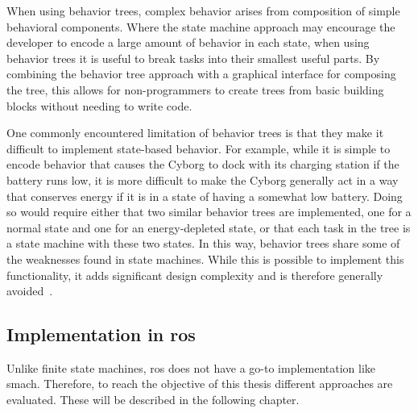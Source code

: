 \documentclass[\rootfolder/main.tex]{subfiles}
\begin{document}
When using behavior trees, complex behavior arises from composition of simple behavioral components.
Where the state machine approach may encourage the developer to encode a large amount of behavior in each state, when using behavior trees it is useful to break tasks into their smallest useful parts.
By combining the behavior tree approach with a graphical interface for composing the tree, this allows for non-programmers to create trees from basic building blocks without needing to write code.

One commonly encountered limitation of behavior trees is that they make it difficult to implement state-based behavior.
For example, while it is simple to encode behavior that causes the Cyborg to dock with its charging station if the battery runs low, it is more difficult to make the Cyborg generally act in a way that conserves energy if it is in a state of having a somewhat low battery.
Doing so would require either that two similar behavior trees are implemented, one for a normal state and one for an energy-depleted state, or that each task in the tree is a state machine with these two states.
In this way, behavior trees share some of the weaknesses found in state machines.
While this is possible to implement this functionality, it adds significant design complexity and is therefore generally avoided~\cite{Millington2009}.


\subsection{Implementation in \acrshort{ros}}

Unlike finite state machines, \acrshort{ros} does not have a go-to implementation like \acrshort{smach}.
Therefore, to reach the objective of this thesis different approaches are evaluated.
These will be described in the following chapter.
\end{document}

